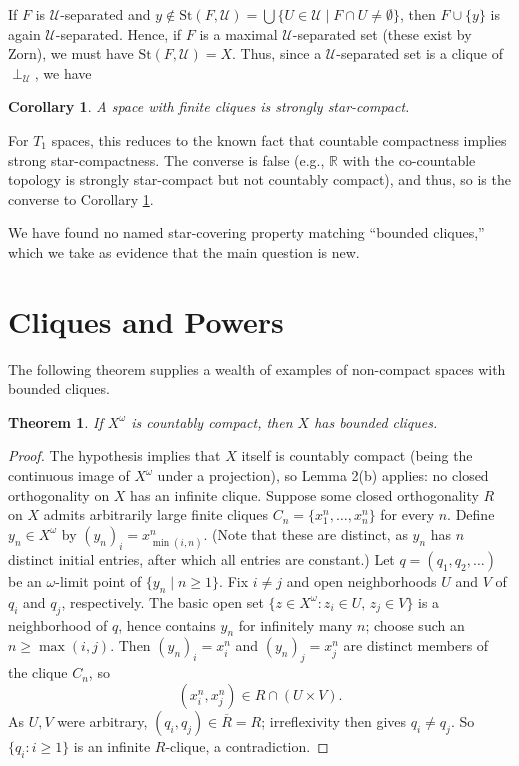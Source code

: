 \documentclass[12pt]{article}
\newcommand{\R}{{\mathbb R}}
\newcommand{\st}{\mbox{St}}
\theoremstyle{plain}
\newtheorem{theorem}{Theorem}
\newtheorem{corollary}{Corollary}
\theoremstyle{definition}
\theoremstyle{remark}
\newcommand{\blue}{\color{blue}}
\begin{document}
If $F$ is $\mathcal U$-separated and 
$y \not \in \st(F,{\mathcal U}) = \bigcup\{ U \in {\mathcal U} \mid F \cap U \not = \emptyset\}$, then 
$F \cup \{y\}$ is again $\mathcal U$-separated. Hence, 
if $F$ is a maximal $\mathcal U$-separated set (these 
exist by Zorn), we must have $\st(F,{\mathcal U}) = X$. Thus, since a ${\mathcal U}$-separated set is a clique 
of $\perp_{\mathcal U}$, we have 

\begin{corollary}\label{starcompact} A space with finite cliques is strongly star-compact{\blue .}
\end{corollary} 

For $T_1$ spaces, this reduces to the known 
fact that countable compactness implies strong star-compactness. The converse is false (e.g., $\R$ with the co-countable topology is strongly star-compact but 
not countably compact), and thus, so is the converse to Corollary \ref{starcompact}. 

We have found no named star-covering property matching ``bounded cliques,'' which we take as evidence that the main question is new.


\section{Cliques and Powers}

The following theorem supplies a wealth of 
examples of non-compact spaces with bounded cliques.

\begin{theorem}\label{omegapower}
If $X^{\omega}$ is countably compact, then $X$ has bounded cliques.
\end{theorem}

\begin{proof} 
The hypothesis implies that $X$ itself is countably compact (being the continuous image of $X^{\omega}$ under a projection), so Lemma 2(b) applies: no  closed orthogonality on $X$ has an infinite clique.  
Suppose some closed orthogonality $R$ on $X$ admits  arbitrarily large finite cliques $C_n = \{x^n_1, \dots, x^n_n\}$ for every $n$.
 Define $y_n \in X^{\omega}$ by $(y_n)_i = x^n_{\min(i,n)}$. (Note that these 
 are distinct, as $y_{n}$ has $n$ distinct initial 
 entries, after which all entries are constant.) 
Let $q = (q_1, q_2, \dots)$ 
be an $\omega$-limit point of $\{y_n \mid n \geq 1\}$.
Fix $i \neq j$ and open neighborhoods $U$ and $V$ of $q_i$ and $q_j$, respectively.
The basic open set $\{z \in X^\omega : z_i \in U, \, z_j \in V\}$ is a neighborhood of $q$, hence contains $y_n$ for infinitely many $n$; choose such an $n \geq \max(i,j)$. Then $(y_n)_i = x^n_i$ and $(y_n)_j = x^n_j$ are distinct members of the clique $C_n$, so
\[ (x^n_i, x^n_j) \in R \cap (U \times V). \]
As $U, V$ were arbitrary, $(q_i, q_j) \in \overline{R} = R$; irreflexivity then gives $q_i \neq q_j$. So $\{q_i : i \geq 1\}$ is an infinite $R$-clique, 
a contradiction.
\end{proof}
\end{document}
